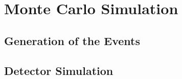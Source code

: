 \section{Monte Carlo Simulation}
\label{chap:event:MC}

\subsection{Generation of the Events}

\subsection{Detector Simulation}
